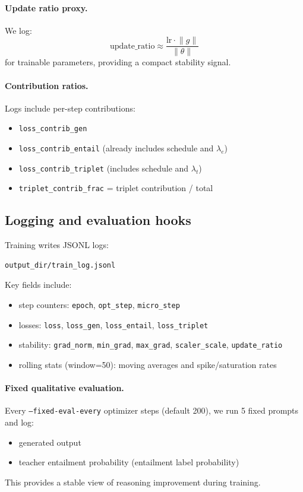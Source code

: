 \documentclass[11pt]{article}
\begin{document}
\paragraph{Update ratio proxy.}
We log:
\[
\text{update\_ratio} \approx \frac{\text{lr}\cdot\lVert g\rVert}{\lVert \theta\rVert}
\]
for trainable parameters, providing a compact stability signal.

\paragraph{Contribution ratios.}
Logs include per-step contributions:
\begin{itemize}
  \item \texttt{loss\_contrib\_gen}
  \item \texttt{loss\_contrib\_entail} (already includes schedule and $\lambda_e$)
  \item \texttt{loss\_contrib\_triplet} (includes schedule and $\lambda_t$)
  \item \texttt{triplet\_contrib\_frac} = triplet contribution / total
\end{itemize}

\subsection{Logging and evaluation hooks}
Training writes JSONL logs:
\begin{lstlisting}
output_dir/train_log.jsonl
\end{lstlisting}
Key fields include:
\begin{itemize}
  \item step counters: \texttt{epoch}, \texttt{opt\_step}, \texttt{micro\_step}
  \item losses: \texttt{loss}, \texttt{loss\_gen}, \texttt{loss\_entail}, \texttt{loss\_triplet}
  \item stability: \texttt{grad\_norm}, \texttt{min\_grad}, \texttt{max\_grad}, \texttt{scaler\_scale}, \texttt{update\_ratio}
  \item rolling stats (window=50): moving averages and spike/saturation rates
\end{itemize}

\paragraph{Fixed qualitative evaluation.}
Every \texttt{--fixed-eval-every} optimizer steps (default 200), we run 5 fixed prompts and log:
\begin{itemize}
  \item generated output
  \item teacher entailment probability (entailment label probability)
\end{itemize}
This provides a stable view of reasoning improvement during training.
\end{document}
